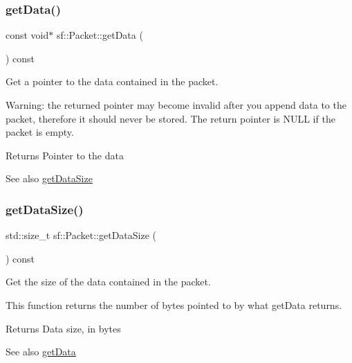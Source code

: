\subsubsection{\texorpdfstring{getData()}{getData()}}
{\footnotesize\ttfamily const void$\ast$ sf\+::\+Packet\+::get\+Data (\begin{DoxyParamCaption}{ }\end{DoxyParamCaption}) const}



Get a pointer to the data contained in the packet. 

Warning\+: the returned pointer may become invalid after you append data to the packet, therefore it should never be stored. The return pointer is N\+U\+LL if the packet is empty.

\begin{DoxyReturn}{Returns}
Pointer to the data
\end{DoxyReturn}
\begin{DoxySeeAlso}{See also}
\mbox{\hyperlink{classsf_1_1_packet_a0fae6eccf2ca704fc5099cd90a9f56f7}{get\+Data\+Size}} \begin{DoxyVerb}\end{DoxyVerb}
 
\end{DoxySeeAlso}
\mbox{\label{classsf_1_1_packet_a0fae6eccf2ca704fc5099cd90a9f56f7}} 
\subsubsection{\texorpdfstring{getDataSize()}{getDataSize()}}
{\footnotesize\ttfamily std\+::size\+\_\+t sf\+::\+Packet\+::get\+Data\+Size (\begin{DoxyParamCaption}{ }\end{DoxyParamCaption}) const}



Get the size of the data contained in the packet. 

This function returns the number of bytes pointed to by what get\+Data returns.

\begin{DoxyReturn}{Returns}
Data size, in bytes
\end{DoxyReturn}
\begin{DoxySeeAlso}{See also}
\mbox{\hyperlink{classsf_1_1_packet_abfd771803c822f89f187e1fcc2af5afc}{get\+Data}} \begin{DoxyVerb}\end{DoxyVerb}
 
\end{DoxySeeAlso}
\mbox{\label{classsf_1_1_packet_ab71a31ef0f1d5d856de6f9fc75434128}} 
